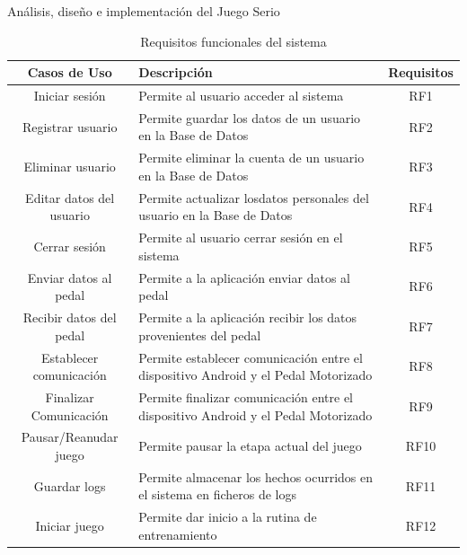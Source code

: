 \begin{thesischapter}{2} {Análisis, diseño e implementación del Juego Serio}
    \begin{table}[ht]
        \centering
        \begin{tabularx}{0.85\textwidth}{|c|X|c|}
            \hline
            \textbf{Casos de Uso} & \textbf{Descripción} & \textbf{Requisitos}\\\hline
            Iniciar sesión & Permite al usuario acceder al sistema & RF1\\\hline
            Registrar usuario & Permite guardar los datos de un usuario en la Base de Datos & RF2\\\hline
            Eliminar usuario & Permite eliminar la cuenta de un usuario en la Base de Datos & RF3\\\hline
            Editar datos del usuario & Permite actualizar losdatos personales del usuario en la Base de Datos & RF4\\\hline
            Cerrar sesión & Permite al usuario cerrar sesión en el sistema & RF5\\\hline
            Enviar datos al pedal & Permite a la aplicación enviar datos al pedal & RF6 \\\hline
            Recibir datos del pedal & Permite a la aplicación recibir los datos provenientes del pedal & RF7\\\hline
            Establecer comunicación & Permite establecer comunicación entre el dispositivo Android y el Pedal Motorizado & RF8\\\hline
            Finalizar Comunicación & Permite finalizar comunicación entre el dispositivo Android y el Pedal Motorizado & RF9\\\hline
            Pausar/Reanudar juego & Permite pausar la etapa actual del juego & RF10\\\hline
            Guardar logs & Permite almacenar los hechos ocurridos en el sistema en ficheros de logs & RF11\\\hline
            Iniciar juego & Permite dar inicio a la rutina de entrenamiento & RF12\\\hline
        \end{tabularx}
        \label{tab: rf}
        \caption{Requisitos funcionales del sistema}
    \end{table}
    

\end{thesischapter}
